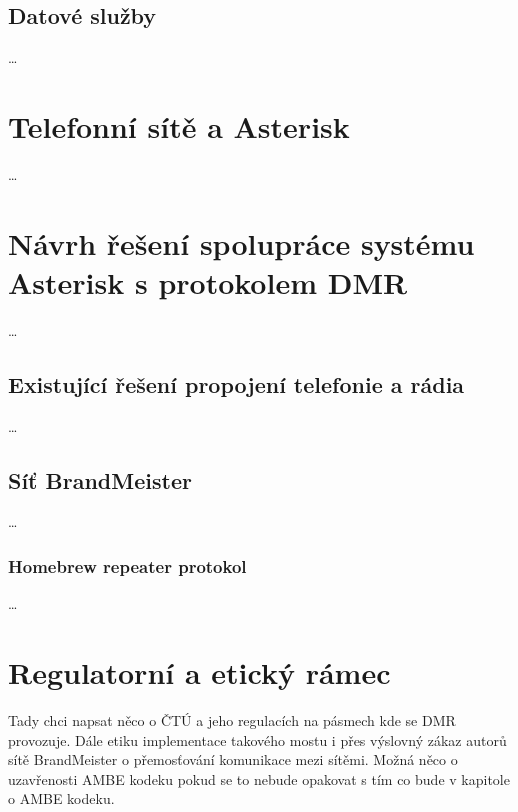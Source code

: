 \documentclass[twoside]{ctuthesis}
\begin{document}
\section{Datové služby}
\ldots

\chapter{Telefonní sítě a Asterisk}
\ldots

\chapter{Návrh řešení spolupráce systému Asterisk s protokolem DMR}
\ldots

\section{Existující řešení propojení telefonie a rádia}
\ldots

\section{Síť BrandMeister}
\ldots

\subsection{Homebrew repeater protokol}
\ldots

\chapter{Regulatorní a etický rámec}
\label{chap:regule}
Tady chci napsat něco o ČTÚ a jeho regulacích na pásmech kde se DMR provozuje.
Dále etiku implementace takového mostu i přes výslovný zákaz autorů sítě BrandMeister o přemosťování komunikace mezi sítěmi.
Možná něco o uzavřenosti AMBE kodeku pokud se to nebude opakovat s tím co bude v kapitole o AMBE kodeku.


\end{document}
